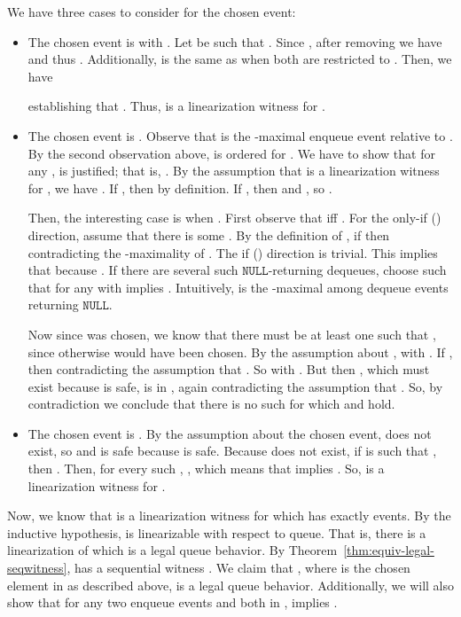 \documentclass{LMCS}
\newcommand{\NULL}{\ensuremath{\mathtt{NULL}}}
\begin{document}
We have three cases to consider for the chosen event:
\begin{itemize} 
\item The chosen event is  with .
Let  be such that .
Since , after removing  we have  and thus .
Additionally,  is the same as  when both are restricted to .
Then, we have

establishing that .
Thus,  is a linearization witness for .

\item The chosen event is . 
Observe that  is the -maximal enqueue event  relative to .
By the second observation above,  is ordered for .
We have to show that for any ,  is justified; that is, .
By the assumption that  is a linearization witness for , we have .
If , then  by definition.
If , then  and , so .

Then, the interesting case is when . 
First observe that  iff .
For the only-if () direction, assume that there is some .
By the definition of , if  then  contradicting the -maximality of .
The if () direction is trivial.
This implies that  because .
If there are several such \NULL-returning dequeues, choose  such that for any  with  implies .
Intuitively,  is the -maximal among dequeue events returning \NULL.

Now since  was chosen, we know that there must be at least one  such that , since otherwise  would have been chosen.
By the assumption about ,  with .
If , then  contradicting the assumption that .
So  with .
But then , which must exist because  is safe, is in , again contradicting the assumption that .
So, by contradiction we conclude that there is no such  for which  and  hold.

\item The chosen event is .
By the assumption about the chosen event,  does not exist, so  and  is safe because  is safe.
Because  does not exist, if  is such that , then . 
Then, for every such , , which means that  implies . 
So,  is a linearization witness for .

\end{itemize}

\noindent Now, we know that  is a linearization witness for  which has exactly  events.
By the inductive hypothesis,  is linearizable with respect to queue. 
That is, there is a linearization  of  which is a legal queue behavior.
By Theorem~\ref{thm:equiv-legal-seqwitness},  has a sequential witness .
We claim that , where  is the chosen element in  as described above, is a legal queue behavior.
Additionally, we will also show that for any two enqueue events  and  both in ,  implies .
\end{document}
